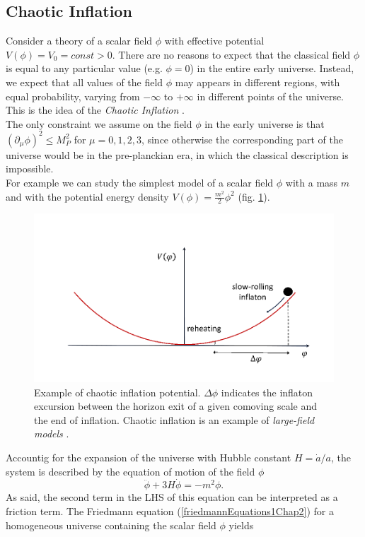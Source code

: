 \documentclass[11pt,a4paper,twoside]{book}
\begin{document}
\subsection{Chaotic Inflation}
Consider a theory of a scalar field $\phi$ with effective potential $ V(\phi)=V_{0} = const > 0$. There are no reasons to expect that the classical field $\phi$ is equal to any particular value (e.g. $\phi = 0$) in the entire early universe. Instead, we expect that all values of the field $\phi$ may appears in different regions, with equal probability, varying from  $ -\infty $ to $ +\infty $ in different points of the universe. This is the idea of the \textit{Chaotic Inflation} \cite{ChaoticInflationLinde:Chap2}.\\
The only constraint we assume on the field $\phi$ in the early universe is that $ (\partial_{\mu} \phi)^{2} \le M_{P}^{2} $ for $ \mu = 0,1,2,3 $, since otherwise the corresponding part of the universe would be in the pre-planckian era, in which the classical description is impossible.\\
For example we can study the simplest model of a scalar field $\phi$ with a mass $ m $ and with the potential energy density $ V(\phi) = \frac{m^{2}}{2}\phi^{2} $ (fig. \ref{fig:chaoticinflationgwfrominflationfig3}).
\begin{figure}
	\centering
	\includegraphics[width=0.55\linewidth, height=0.24\textheight]{Images/Chap2/ChaoticInflation_GWFromInflation_Fig3}
	\caption{Example of chaotic inflation potential. $ \Delta \phi $  indicates the inflaton excursion between the horizon exit of a given comoving scale and the end of inflation. Chaotic inflation is an example of \textit{large-field models} \cite{GWFromInflation:Intro}.}
	\label{fig:chaoticinflationgwfrominflationfig3}
\end{figure}
 Accountig for the expansion of the universe with Hubble constant $ H=\dot{a}/a $, the system is described by the equation of motion of the field $\phi$
\begin{equation}
	\label{Chap2eomChaoticInflation}
	\ddot{\phi} + 3H\dot{\phi} = -m^{2}\phi. 
\end{equation}
As said, the second term in the LHS of this equation can be interpreted as a friction term. The Friedmann equation (\ref{friedmannEquations1Chap2}) for a homogeneous universe containing the scalar field $\phi$ yields
\end{document}
